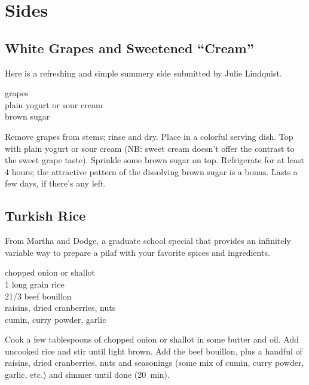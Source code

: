 \chapter{Sides}

\section{White Grapes and Sweetened ``Cream''
}

\begin{open}
Here is a refreshing and simple summery side submitted by Julie Lindquist.
\end{open}
\begin{ingredients}
    grapes\\
    plain yogurt or sour cream\\
    brown sugar
\end{ingredients}
Remove grapes from stems; rinse and dry. Place in a colorful serving dish. Top
with plain yogurt or sour cream (NB: sweet cream doesn't offer the contrast to the sweet grape taste). Sprinkle some brown sugar on top. Refrigerate for at
least 4 hours; the attractive pattern of the dissolving brown sugar is a
bonus. Lasts a few days, if there’s any left.

\section{Turkish Rice}

\begin{open}
    From Martha and Dodge, a graduate school special that provides an infinitely
    variable way to prepare a pilaf with your favorite spices and ingredients.
\end{open}
\begin{ingredients}
    chopped onion or shallot\\
    \SI{1}{\cup} long grain rice\\
    2\SI{1/3}{\cup} beef bouillon\\
    raisins, dried cranberries, nuts\\
    cumin, curry powder, garlic
\end{ingredients}
Cook a few tablespoons of chopped onion or shallot in some butter and oil. Add
uncooked rice and stir until light brown. Add the beef bouillon, plus a handful
of raisins, dried cranberries, nuts and seasonings (some mix of cumin, curry
powder, garlic, etc.) and simmer until done (\SI{20}{\minute}).

